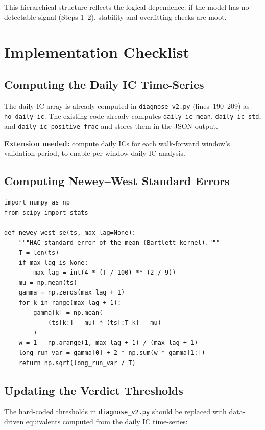 \documentclass[11pt,a4paper]{article}
\theoremstyle{definition}
\begin{document}
This hierarchical structure reflects the logical dependence: if the
model has no detectable signal (Steps 1--2), stability and overfitting
checks are moot.

\section{Implementation Checklist}
\label{sec:implementation}

\subsection{Computing the Daily IC Time-Series}

The daily IC array is already computed in \texttt{diagnose\_v2.py}
(lines~190--209) as \texttt{ho\_daily\_ic}. The existing code already
computes \texttt{daily\_ic\_mean}, \texttt{daily\_ic\_std}, and
\texttt{daily\_ic\_positive\_frac} and stores them in the JSON output.

\textbf{Extension needed:} compute daily ICs for each walk-forward
window's validation period, to enable per-window daily-IC analysis.

\subsection{Computing Newey--West Standard Errors}

\begin{verbatim}
import numpy as np
from scipy import stats

def newey_west_se(ts, max_lag=None):
    """HAC standard error of the mean (Bartlett kernel)."""
    T = len(ts)
    if max_lag is None:
        max_lag = int(4 * (T / 100) ** (2 / 9))
    mu = np.mean(ts)
    gamma = np.zeros(max_lag + 1)
    for k in range(max_lag + 1):
        gamma[k] = np.mean(
            (ts[k:] - mu) * (ts[:T-k] - mu)
        )
    w = 1 - np.arange(1, max_lag + 1) / (max_lag + 1)
    long_run_var = gamma[0] + 2 * np.sum(w * gamma[1:])
    return np.sqrt(long_run_var / T)
\end{verbatim}

\subsection{Updating the Verdict Thresholds}

The hard-coded thresholds in \texttt{diagnose\_v2.py} should be
replaced with data-driven equivalents computed from the daily IC
time-series:
\end{document}
